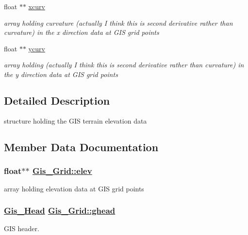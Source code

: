 \begin{CompactItemize}
float $\ast$$\ast$ \hyperlink{structGis__Grid_o5}{xcurv}
\begin{CompactList}\small\item\em array holding curvature (actually I think this is second derivative rather than curvature) in the x direction data at GIS grid points \item\end{CompactList}\item 
float $\ast$$\ast$ \hyperlink{structGis__Grid_o6}{ycurv}
\begin{CompactList}\small\item\em array holding (actually I think this is second derivative rather than curvature) in the y direction data at GIS grid points \item\end{CompactList}\end{CompactItemize}


\subsection{Detailed Description}
structure holding the GIS terrain elevation data 



\subsection{Member Data Documentation}
\hypertarget{structGis__Grid_o1}{
\subsubsection[elev]{\setlength{\rightskip}{0pt plus 5cm}float$\ast$$\ast$ \hyperlink{structGis__Grid_o1}{Gis\_\-Grid::elev}}}
\label{structGis__Grid_o1}


array holding elevation data at GIS grid points 

\hypertarget{structGis__Grid_o0}{
\subsubsection[ghead]{\setlength{\rightskip}{0pt plus 5cm}\hyperlink{structGis__Head}{Gis\_\-Head} \hyperlink{structGis__Grid_o0}{Gis\_\-Grid::ghead}}}
\label{structGis__Grid_o0}


GIS header. 


